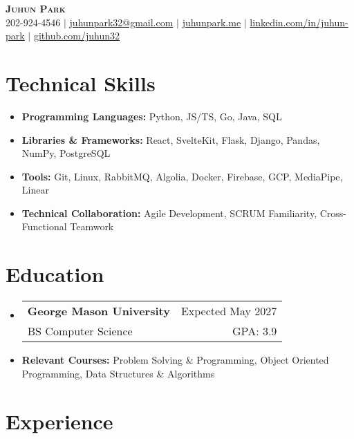 \documentclass[letterpaper,11pt]{article}
\makeatletter
\newcommand{\resumeItem}[1]{
  \item{
    {#1}
  }
}
\newcommand{\resumeItemThin}[1]{
  \item{
    {#1 \vspace{-5pt}}
  }
}
\newcommand{\resumeSubheading}[4]{
    \item
    \begin{tabular*}{0.985\textwidth}[t]{l@{\extracolsep{\fill}}r@{\hspace{-0.1in}}}
        {\textbf{#1}} & {#2} \\
        #3 &  #4 \\
    \end{tabular*}\vspace{-5pt}
}
\newcommand{\resumeSubHeadingListStart}{\begin{itemize}[leftmargin=0.00in, rightmargin=-0.2in, label={}]\vspace{3pt}}
\newcommand{\resumeSubHeadingListEnd}{\end{itemize}\vspace{-5pt}}
\newcommand{\resumeItemListStart}{\vspace{3pt}\begin{itemize}[leftmargin=0.15in, rightmargin=0.15in]}
\newcommand{\resumeItemListEnd}{\end{itemize}\vspace{-5pt}}
\makeatother
\begin{document}

\begin{center}
  \textbf{\Huge \scshape {Juhun Park}} \\ \vspace{3pt}
   202-924-4546 $|$
  \href{mailto:juhunpark32@gmail.com}{juhunpark32@gmail.com} $|$
  \href{https://www.juhunpark.me/}{juhunpark.me} $|$
  \href{https://linkedin.com/in/juhun-park}{linkedin.com/in/juhun-park} $|$
  \href{https://github.com/juhun32}{github.com/juhun32} \\
\end{center}

\vspace{-10pt}


\section{Technical Skills}
\resumeItemListStart
\resumeItemThin{\textbf{Programming Languages: }{Python, JS/TS, Go, Java, SQL}}\\
\resumeItemThin{\textbf{Libraries \& Frameworks: }{React, SvelteKit, Flask, Django, Pandas, NumPy, PostgreSQL}}\\
\resumeItemThin{\textbf{Tools: }{Git, Linux, RabbitMQ, Algolia, Docker, Firebase, GCP, MediaPipe, Linear}}\\
\resumeItemThin{\textbf{Technical Collaboration: }{Agile Development, SCRUM Familiarity, Cross-Functional Teamwork}}

\resumeItemListEnd


\section{Education}
\resumeSubHeadingListStart
\resumeSubheading
{George Mason University}{Expected May 2027}
{BS Computer Science}{GPA: 3.9}
\resumeItem{\textbf{Relevant Courses: }{Problem Solving \& Programming, Object Oriented Programming, Data Structures \& Algorithms}}
\vspace{-5pt}
\resumeSubHeadingListEnd


\section{Experience}
\end{document}
